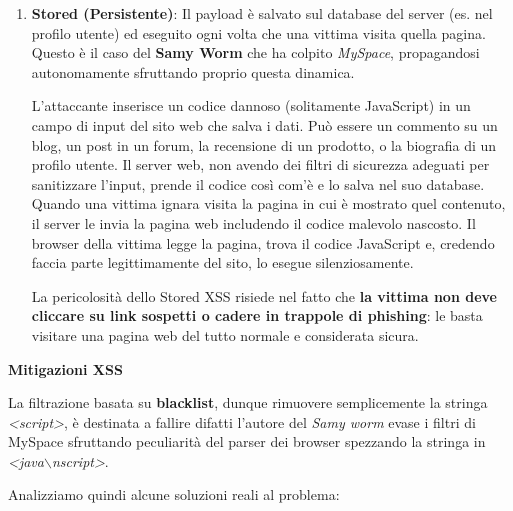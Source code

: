 \begin{enumerate}
    \item \textbf{Stored (Persistente)}: Il payload è salvato sul database 
    del server (es. nel profilo utente) ed eseguito ogni volta che una 
    vittima visita quella pagina. Questo è il caso del \textbf{Samy Worm} che ha 
    colpito \textit{MySpace}, propagandosi autonomamente sfruttando proprio questa 
    dinamica.

    L'attaccante inserisce un codice dannoso (solitamente JavaScript) in un 
    campo di input del sito web che salva i dati. Può essere un commento su 
    un blog, un post in un forum, la recensione di un prodotto, o la 
    biografia di un profilo utente. Il server web, non avendo dei filtri 
    di sicurezza adeguati per sanitizzare l'input, prende il codice così 
    com'è e lo salva nel suo database. Quando una vittima ignara visita la 
    pagina in cui è mostrato quel contenuto, il server le invia la pagina 
    web includendo il codice malevolo nascosto. Il browser della vittima 
    legge la pagina, trova il codice JavaScript e, credendo faccia parte 
    legittimamente del sito, lo esegue silenziosamente.

    La pericolosità dello Stored XSS risiede nel fatto che \textbf{la vittima non 
    deve cliccare su link sospetti o cadere in trappole di phishing}: le 
    basta visitare una pagina web del tutto normale e considerata sicura.

\end{enumerate}

\textbf{Mitigazioni XSS}

La filtrazione basata su \textbf{blacklist}, dunque rimuovere semplicemente 
la stringa \textit{<script>}, è destinata a fallire difatti l'autore del \textit{Samy worm} 
evase i filtri di MySpace sfruttando peculiarità del parser dei browser 
spezzando la stringa in \textit{<java$\backslash$nscript>}.

Analizziamo quindi alcune soluzioni reali al problema:

